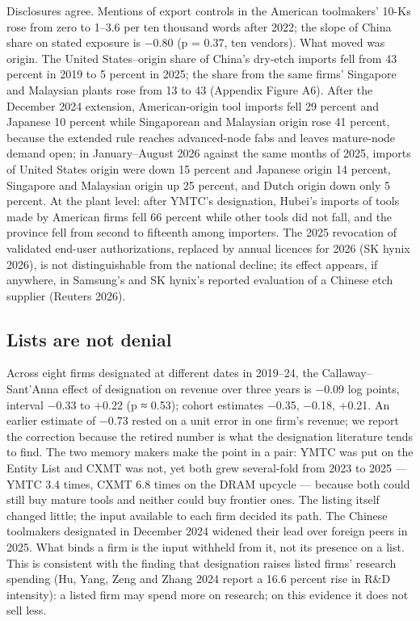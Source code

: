 \documentclass[12pt]{article}
\begin{document}
Disclosures agree. Mentions of export controls in the American toolmakers' 10-Ks rose from zero to 1--3.6 per ten thousand words after 2022; the slope of China share on stated exposure is −0.80 (p = 0.37, ten vendors). What moved was origin. The United States--origin share of China's dry-etch imports fell from 43 percent in 2019 to 5 percent in 2025; the share from the same firms' Singapore and Malaysian plants rose from 13 to 43 (Appendix Figure A6). After the December 2024 extension, American-origin tool imports fell 29 percent and Japanese 10 percent while Singaporean and Malaysian origin rose 41 percent, because the extended rule reaches advanced-node fabs and leaves mature-node demand open; in January--August 2026 against the same months of 2025, imports of United States origin were down 15 percent and Japanese origin 14 percent, Singapore and Malaysian origin up 25 percent, and Dutch origin down only 5 percent. At the plant level: after YMTC's designation, Hubei's imports of tools made by American firms fell 66 percent while other tools did not fall, and the province fell from second to fifteenth among importers. The 2025 revocation of validated end-user authorizations, replaced by annual licences for 2026 (SK hynix 2026), is not distinguishable from the national decline; its effect appears, if anywhere, in Samsung's and SK hynix's reported evaluation of a Chinese etch supplier (Reuters 2026).

\subsection{Lists are not denial}

Across eight firms designated at different dates in 2019--24, the Callaway--Sant'Anna effect of designation on revenue over three years is −0.09 log points, interval −0.33 to +0.22 (p ≈ 0.53); cohort estimates −0.35, −0.18, +0.21. An earlier estimate of −0.73 rested on a unit error in one firm's revenue; we report the correction because the retired number is what the designation literature tends to find. The two memory makers make the point in a pair: YMTC was put on the Entity List and CXMT was not, yet both grew several-fold from 2023 to 2025 --- YMTC 3.4 times, CXMT 6.8 times on the DRAM upcycle --- because both could still buy mature tools and neither could buy frontier ones. The listing itself changed little; the input available to each firm decided its path. The Chinese toolmakers designated in December 2024 widened their lead over foreign peers in 2025. What binds a firm is the input withheld from it, not its presence on a list. This is consistent with the finding that designation raises listed firms' research spending (Hu, Yang, Zeng and Zhang 2024 report a 16.6 percent rise in R\&D intensity): a listed firm may spend more on research; on this evidence it does not sell less.
\end{document}
